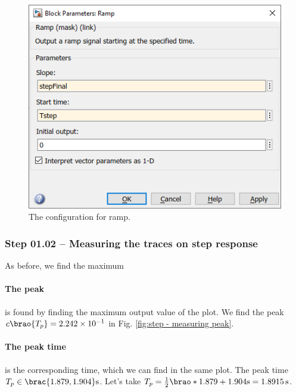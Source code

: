 \documentclass[12pt]{article}
\DeclarePairedDelimiter\brao()%
\DeclarePairedDelimiter\brac[]%
\begin{document}
\begin{figure}[h]
    \centering
    \includegraphics[width=(5in/689)*464]{part01b_ramp_parameters.png}
    \caption{The configuration for ramp.}
    \label{fig:ramp response model parameters}
\end{figure}

\subsubsection{Step 01.02 -- Measuring the traces on step response}

As before, we find the maximum

\paragraph{The peak} is found by finding the maximum output value of the plot.
We find the peak $c\brao{T_p} = \num{2.242e-1}$ in Fig. \ref{fig:step - measuring peak}.

\paragraph{The peak time} is the corresponding time, which we can find in the same plot.
The peak time $T_p \in \brac{{1.879}, {1.904}}\si\second$.
Let's take $T_p = \frac12\brao*{1.879 + 1.904}\si\second = \SI{1.8915}\second$.
\end{document}
